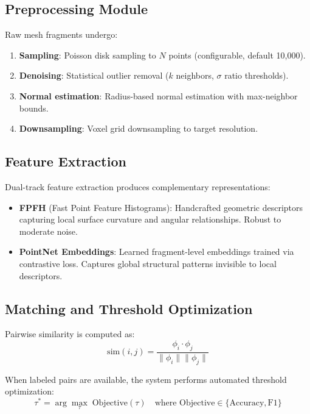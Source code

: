 \documentclass[11pt,a4paper]{article}
\begin{document}
\subsection{Preprocessing Module}

Raw mesh fragments undergo:
\begin{enumerate}
    \item \textbf{Sampling}: Poisson disk sampling to $N$ points (configurable, default 10,000).
    \item \textbf{Denoising}: Statistical outlier removal ($k$ neighbors, $\sigma$ ratio thresholds).
    \item \textbf{Normal estimation}: Radius-based normal estimation with max-neighbor bounds.
    \item \textbf{Downsampling}: Voxel grid downsampling to target resolution.
\end{enumerate}

\subsection{Feature Extraction}

Dual-track feature extraction produces complementary representations:

\begin{itemize}
    \item \textbf{FPFH} (Fast Point Feature Histograms): Handcrafted geometric descriptors capturing local surface curvature and angular relationships. Robust to moderate noise.
    \item \textbf{PointNet Embeddings}: Learned fragment-level embeddings trained via contrastive loss. Captures global structural patterns invisible to local descriptors.
\end{itemize}

\subsection{Matching and Threshold Optimization}

Pairwise similarity is computed as:
\begin{equation}
    \text{sim}(i, j) = \frac{\phi_i \cdot \phi_j}{\|\phi_i\| \|\phi_j\|}
\end{equation}

When labeled pairs are available, the system performs automated threshold optimization:
\begin{equation}
    \tau^* = \arg\max_\tau \; \text{Objective}(\tau) \quad \text{where Objective} \in \{\text{Accuracy}, \text{F1}\}
\end{equation}
\end{document}
